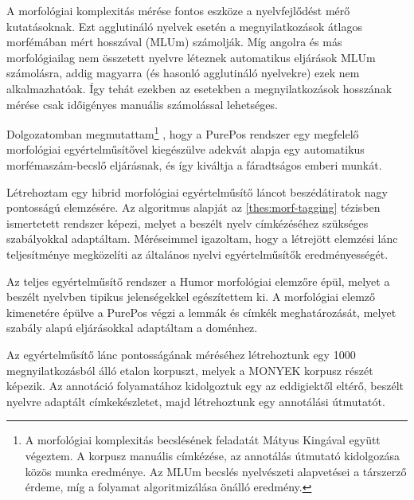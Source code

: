 A morfológiai komplexitás mérése fontos eszköze a nyelvfejlődést mérő kutatásoknak.
Ezt agglutináló nyelvek esetén a megnyilatkozások átlagos morfémában mért hosszával (MLUm) számolják.
Míg angolra és más morfológiailag nem összetett nyelvre léteznek automatikus eljárások MLUm számolásra, 
addig magyarra (és hasonló agglutináló nyelvekre) ezek nem alkalmazhatóak. 
Így tehát ezekben az esetekben a megnyilatkozások hosszának mérése csak időigényes manuális számolással lehetséges.

Dolgozatomban megmutattam\footnote{A morfológiai komplexitás becslésének feladatát Mátyus Kingával együtt végeztem. A korpusz manuális címkézése, az annotálás útmutató kidolgozása közös munka eredménye. Az MLUm becslés nyelvészeti alapvetései a társzerző érdeme, míg a folyamat algoritmizálása önálló eredmény.}
, hogy a PurePos rendszer egy megfelelő morfológiai egyértelműsítővel kiegészülve adekvát alapja egy automatikus morfémaszám-becslő eljárásnak, és így kiváltja a fáradtságos emberi munkát. 

\begin{core}
\begin{thesis}
\label{thes:spoken-morf-tagging}
Létrehoztam egy  hibrid morfológiai egyértelműsítő láncot beszédátiratok nagy pontosságú elemzésére. 
Az algoritmus alapját az \ref{thes:morf-tagging} tézisben ismertetett rendszer képezi, melyet a beszélt nyelv címkézéséhez szükséges szabályokkal adaptáltam. 
Méréseimmel igazoltam, hogy a létrejött elemzési lánc teljesítménye megközelíti az általános nyelvi egyértelműsítők eredményességét.
\end{thesis}

\begin{pub}
\cite{Matyus2014,Orosz2014c}
\end{pub}
\end{core}

Az teljes egyértelműsítő rendszer a Humor morfológiai elemzőre épül, melyet a beszélt nyelvben tipikus jelenségekkel egészítettem ki. 
A morfológiai elemző kimenetére épülve a PurePos végzi a lemmák és címkék meghatározását, melyet szabály alapú eljárásokkal adaptáltam a doménhez.

Az egyértelműsítő lánc pontosságának méréséhez létrehoztunk egy 1000 megnyilatkozásból álló etalon korpuszt, melyek a MONYEK \cite{Matyus2014} korpusz részét képezik. 
Az annotáció folyamatához kidolgoztuk egy az eddigiektől eltérő, beszélt nyelvre adaptált címkekészletet, majd létrehoztunk egy annotálási útmutatót.

